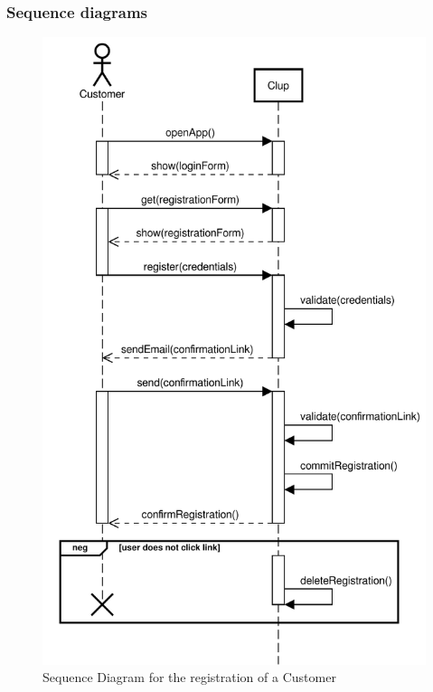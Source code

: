 \subsubsection{Sequence diagrams}
\begin{figure}[H]
    \centering
    \includegraphics[scale=0.9]{Images/Sequence/create-account_sequence_straight.pdf}
    \caption{Sequence Diagram for the registration of a Customer}
\end{figure}
